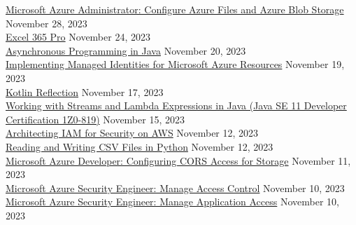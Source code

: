 \documentclass[10pt]{res} %
\begin{document}
\begin{resume}
\href{https://bjdelacruz.dev/files/certificates/pluralsight/Microsoft_Azure_Administrator_Configure_Azure_Files_and_Azure_Blob_Storage.pdf}{\color{blue}Microsoft Azure Administrator: Configure Azure Files and Azure Blob Storage} \hfill November 28, 2023 \\
\href{https://bjdelacruz.dev/files/certificates/pluralsight/Excel_365_Pro.pdf}{\color{blue}Excel 365 Pro} \hfill November 24, 2023 \\
\href{https://bjdelacruz.dev/files/certificates/pluralsight/Asynchronous_Programming_in_Java.pdf}{\color{blue}Asynchronous Programming in Java} \hfill November 20, 2023 \\
\href{https://bjdelacruz.dev/files/certificates/pluralsight/Implementing_Managed_Identities_for_Microsoft_Azure_Resources.pdf}{\color{blue}Implementing Managed Identities for Microsoft Azure Resources} \hfill November 19, 2023 \\
\href{https://bjdelacruz.dev/files/certificates/pluralsight/Kotlin_Reflection.pdf}{\color{blue}Kotlin Reflection} \hfill November 17, 2023 \\
\href{https://bjdelacruz.dev/files/certificates/pluralsight/6_Working_with_Streams_and_Lambda_Expressions_in_Java_Java_SE_11_Developer_Certification_1Z0_819.pdf}{\color{blue}Working with Streams and Lambda Expressions in Java (Java SE 11 Developer Certification 1Z0-819)} \hfill November 15, 2023 \\
\href{https://bjdelacruz.dev/files/certificates/pluralsight/Architecting_IAM_for_Security_on_AWS.pdf}{\color{blue}Architecting IAM for Security on AWS} \hfill November 12, 2023 \\
\href{https://bjdelacruz.dev/files/certificates/pluralsight/Reading_and_Writing_CSV_Files_in_Python.pdf}{\color{blue}Reading and Writing CSV Files in Python} \hfill November 12, 2023 \\
\href{https://bjdelacruz.dev/files/certificates/pluralsight/3_Microsoft_Azure_Developer_Configuring_CORS_Access_for_Storage.pdf}{\color{blue}Microsoft Azure Developer: Configuring CORS Access for Storage} \hfill November 11, 2023 \\
\href{https://bjdelacruz.dev/files/certificates/pluralsight/Microsoft_Azure_Security_Engineer_Manage_Access_Control.pdf}{\color{blue}Microsoft Azure Security Engineer: Manage Access Control} \hfill November 10, 2023 \\
\href{https://bjdelacruz.dev/files/certificates/pluralsight/Microsoft_Azure_Security_Engineer_Manage_Application_Access.pdf}{\color{blue}Microsoft Azure Security Engineer: Manage Application Access} \hfill November 10, 2023 \\

\end{resume}
\end{document}
